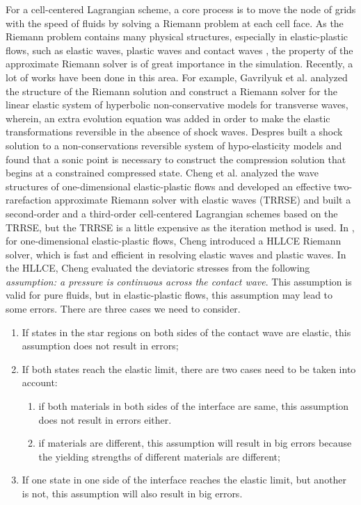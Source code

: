 \documentclass[review]{elsarticle}
\begin{document}
For a cell-centered Lagrangian scheme, a core process is to move the node of grids with the speed of fluids
 by solving a Riemann problem at each cell face. As the Riemann problem contains many physical structures, especially in elastic-plastic flows, such as elastic waves, plastic waves and contact waves
  , the property of the approximate Riemann solver is of great importance in the simulation. Recently, a lot of works have been done in
  this area. For example, Gavrilyuk et al. \cite{gavrilyuk2008modelling} analyzed the structure of the Riemann solution and construct a Riemann solver for the linear elastic system  of hyperbolic non-conservative models for transverse waves, wherein, an extra evolution equation was added in order to make the elastic transformations reversible in the absence of shock waves. Despres \cite{despres2007geometrical} built a shock solution to a non-conservations reversible system of hypo-elasticity models and found that a sonic point is necessary to construct  the compression solution that begins at a constrained compressed state.  Cheng et al.  \cite{cheng2015high} analyzed the wave structures of one-dimensional elastic-plastic flows and developed an effective two-rarefaction approximate Riemann solver with elastic waves (TRRSE) and built a  second-order and  a third-order cell-centered Lagrangian schemes based on the TRRSE, but the TRRSE is a little  expensive as  the iteration method is used.
In \cite{cheng2016harten}, for one-dimensional elastic-plastic flows, Cheng introduced a HLLCE Riemann solver, which is fast and efficient in resolving elastic waves and plastic waves. In the HLLCE,  Cheng evaluated the deviatoric stresses from the following \emph{assumption: a pressure is continuous across the contact wave}. This assumption is valid for pure fluids, but  in  elastic-plastic flows, this assumption may lead to some errors. There are three cases we need  to consider.
\begin{enumerate}
  \item If states in the star regions on both sides of the contact wave are elastic, this assumption does not result in errors;
  \item If both states reach the elastic limit, there are two cases need  to be taken into account:
  \begin{enumerate}
    \item if both  materials in both sides of the interface are same, this assumption does not result in errors either.
    \item if  materials are different, this assumption will result in big errors because the yielding strengths of different materials are different;
  \end{enumerate}
  \item If one state in one side of the interface reaches the elastic limit, but another is  not,  this assumption will  also result in big errors.
\end{enumerate}
\end{document}
